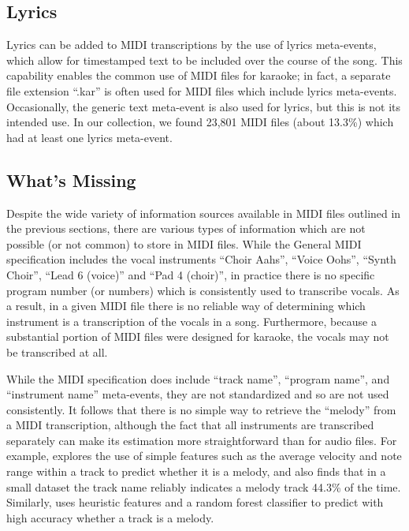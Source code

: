 \subsection{Lyrics}

Lyrics can be added to MIDI transcriptions by the use of lyrics meta-events, which allow for timestamped text to be included over the course of the song.
This capability enables the common use of MIDI files for karaoke; in fact, a separate file extension ``.kar'' is often used for MIDI files which include lyrics meta-events.
Occasionally, the generic text meta-event is also used for lyrics, but this is not its intended use.
In our collection, we found 23,801 MIDI files (about 13.3\%) which had at least one lyrics meta-event.

\subsection{What's Missing}
\label{sec:missing}

Despite the wide variety of information sources available in MIDI files outlined in the previous sections, there are various types of information which are not possible (or not common) to store in MIDI files.
While the General MIDI specification includes the vocal instruments ``Choir Aahs'', ``Voice Oohs'', ``Synth Choir'', ``Lead 6 (voice)'' and ``Pad 4 (choir)'', in practice there is no specific program number (or numbers) which is consistently used to transcribe vocals.
As a result, in a given MIDI file there is no reliable way of determining which instrument is a transcription of the vocals in a song.
Furthermore, because a substantial portion of MIDI files were designed for karaoke, the vocals may not be transcribed at all.

While the MIDI specification does include ``track name'', ``program name'', and ``instrument name'' meta-events, they are not standardized and so are not used consistently.
It follows that there is no simple way to retrieve the ``melody'' from a MIDI transcription, although the fact that all instruments are transcribed separately can make its estimation more straightforward than for audio files.
For example, \cite{tang2000selection} explores the use of simple features such as the average velocity and note range within a track to predict whether it is a melody, and also finds that in a small dataset the track name reliably indicates a melody track 44.3\% of the time.
Similarly, \cite{ponce2008mining} uses heuristic features and a random forest classifier to predict with high accuracy whether a track is a melody.

